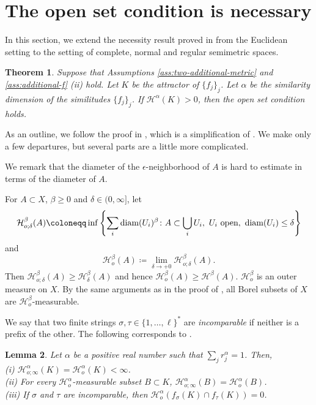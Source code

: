 \documentclass[a4paper, reqno, 11pt]{amsart}
\newtheorem{Thm}{Theorem}[section]
\newtheorem{Lem}[Thm]{Lemma}
\theoremstyle{definition}
\begin{document}
\section{The open set condition is necessary}\label{sec:osc}

In this section, we extend the necessity result proved in \cite{Schief1994} from the Euclidean setting to the setting of complete, normal and regular semimetric spaces.  

\begin{Thm}\label{thm:osc-necessary}
Suppose that Assumptions \ref{ass:two-additional-metric} and \ref{ass:additional-f} (ii) hold. 
Let $K$ be the attractor of $\{f_j\}_j$. 
Let $\alpha$ be the similarity dimension of the similitudes $\{f_j\}_j$. 
If $\mathcal{H}^{\alpha}(K) > 0$, then the open set condition holds.  
\end{Thm}


As an outline, we follow the proof in \cite[Section 9.6]{BishopPeres2017}, which is a simplification of  \cite{Schief1994}. 
We make only a few departures, but several parts are a little more complicated. 


We remark that the diameter of the $\epsilon$-neighborhood of $A$ is hard to estimate in terms of the diameter of $A$. 

For $A  \subset X$, $\beta \ge 0$ and $\delta \in (0, \infty]$, let 
\[ \mathcal{H}^{\beta}_{o;\delta}(A) \coloneqq \inf\left\{\sum_i \textup{diam}(U_i)^{\beta}  \colon A \subset \bigcup_i U_i, \ U_i \textup{ open}, \ \textup{diam}(U_i) \le \delta \right\}  \] 
and 
\[ \mathcal{H}^{\beta}_{o}(A) \coloneqq \lim_{\delta \to +0} \mathcal{H}^{\beta}_{o;\delta}(A). \] 
Then $\mathcal{H}^{\beta}_{o;\delta}(A) \ge \mathcal{H}^{\beta}_{\delta}(A)$ and hence $\mathcal{H}^{\beta}_{o}(A) \ge \mathcal{H}^{\beta}(A)$. 
$\mathcal{H}^{\beta}_{o}$ is an outer measure on $X$. 
By the same arguments as in the proof of  \cite[Lemma 11]{BessenyeiPenzes2022}, all Borel subsets of $X$ are $\mathcal{H}^{\beta}_{o}$-measurable. 

We say that two finite strings $\sigma, \tau \in \{1,\dots, \ell\}^{*}$ are {\it incomparable} if neither is a prefix of the other.  
The following corresponds to \cite[Proposition 2.1.3]{BishopPeres2017}. 

\begin{Lem}\label{lem:open-Haus-basic}
Let $\alpha$ be a positive real number such that $\sum_j r_j^{\alpha} = 1$. 
Then,\\
(i) $\mathcal{H}^{\alpha}_{o;\infty}(K) = \mathcal{H}^{\alpha}_{o}(K) < \infty$. \\
(ii) For every $ \mathcal{H}^{\alpha}_{o}$-measurable subset $B \subset K$, $\mathcal{H}^{\alpha}_{o;\infty}(B) = \mathcal{H}^{\alpha}_{o}(B)$. \\
(iii) If $\sigma$ and $\tau$ are incomparable, then $\mathcal{H}^{\alpha}_{o} \left(f_{\sigma}(K) \cap f_{\tau}(K) \right) = 0$. 
\end{Lem}
\end{document}
